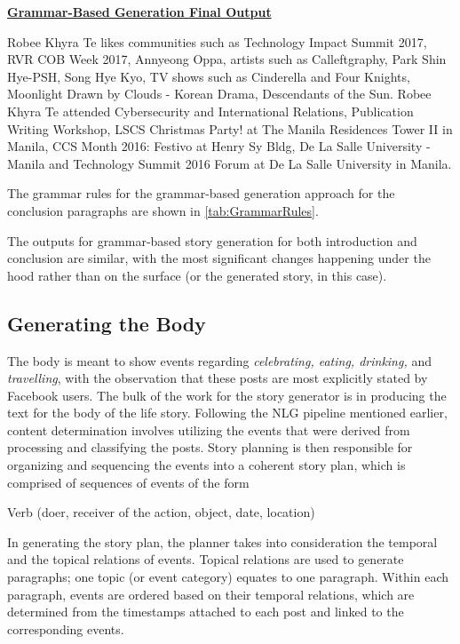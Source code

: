 \underline{\textbf{Grammar-Based Generation Final Output}} \newline
\begin{center}
	Robee Khyra Te likes communities such as Technology Impact Summit 2017, RVR COB Week 2017, Annyeong Oppa, artists  such as Calleftgraphy, Park Shin Hye-PSH, Song Hye Kyo, TV shows  such as Cinderella and Four Knights, Moonlight Drawn by Clouds - Korean Drama, Descendants of the Sun.
	\newline
	Robee Khyra Te attended Cybersecurity and International Relations, Publication Writing Workshop, LSCS Christmas Party! at The Manila Residences Tower II in Manila, CCS Month 2016: Festivo at Henry Sy Bldg, De La Salle University - Manila and Technology Summit 2016 Forum at De La Salle University in Manila.
\end{center}

The grammar rules for the grammar-based generation approach for the conclusion paragraphs are shown in \ref{tab:GrammarRules}.

The outputs for grammar-based story generation for both introduction and conclusion are similar, with the most significant changes happening under the hood rather than on the surface (or the generated story, in this case).

\subsection{Generating the Body}
The body is meant to show events regarding \textit{celebrating, eating, drinking,} and \textit{travelling}, with the observation that these posts are most explicitly stated by Facebook users. The bulk of the work for the story generator is in producing the text for the body of the life story. Following the NLG pipeline mentioned earlier, content determination involves utilizing the events that were derived from processing and classifying the posts. Story planning is then responsible for organizing and sequencing the events into a coherent story plan, which is comprised of sequences of events of the form

\begin{center} Verb (doer, receiver of the action, object, date, location) \end{center}

In generating the story plan, the planner takes into consideration the temporal and the topical relations of events. Topical relations are used to generate paragraphs; one topic (or event category) equates to one paragraph. Within each paragraph, events are ordered based on their temporal relations, which are determined from the timestamps attached to each post and linked to the corresponding events.

